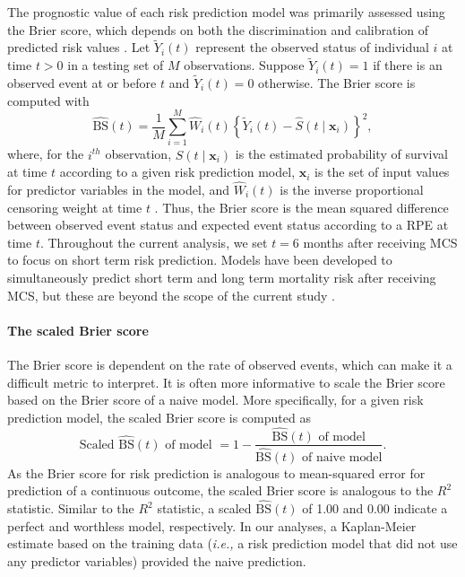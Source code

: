 \documentclass{article}
\begin{document}
The prognostic value of each risk prediction model was primarily
assessed using the Brier score, which depends on both the discrimination
and calibration of predicted risk values
\cite{graf1999assessment, rufibach2010use}. Let \(\tilde{Y}_i(t)\)
represent the observed status of individual \(i\) at time \(t > 0\) in a
testing set of \(M\) observations. Suppose \(\tilde{Y}_i(t)=1\) if there
is an observed event at or before \(t\) and \(\tilde{Y}_i(t)=0\)
otherwise. The Brier score is computed with
\begin{equation} \label{eqn:brier_score}
\widehat{\textrm{BS}}(t)= \frac{1}{M} \sum_{i=1}^{M} \widehat{W}_i(t) \left\{ \tilde{Y}_i(t) - \widehat{S}(t \mid \bm{x}_i) \right\}^2, \end{equation}
where, for the \(i^{th}\) observation, \(\widehat{S}(t \mid \bm{x}_i)\)
is the estimated probability of survival at time \(t\) according to a
given risk prediction model, \(\bm{x}_i\) is the set of input values for
predictor variables in the model, and \(\widehat{W}_i(t)\) is the
inverse proportional censoring weight at time \(t\)
\cite{gerds2006consistent}. Thus, the Brier score is the mean squared
difference between observed event status and expected event status
according to a RPE at time \(t\). Throughout the current analysis, we
set \(t = 6\) months after receiving MCS to focus on short term risk
prediction. Models have been developed to simultaneously predict short
term and long term mortality risk after receiving MCS, but these are
beyond the scope of the current study
\cite{blackstone1986decomposition}.

\paragraph{The scaled Brier score}

The Brier score is dependent on the rate of observed events, which can
make it a difficult metric to interpret. It is often more informative to
scale the Brier score based on the Brier score of a naive model. More
specifically, for a given risk prediction model, the scaled Brier score
is computed as
\[\textrm{Scaled } \widehat{\textrm{BS}}(t)\textrm{ of model } = 1 - \frac{\widehat{\textrm{BS}}(t)\textrm{ of model}}{\widehat{\textrm{BS}}(t)\textrm{ of naive model}}.\]
As the Brier score for risk prediction is analogous to mean-squared
error for prediction of a continuous outcome, the scaled Brier score is
analogous to the \(R^2\) statistic. Similar to the \(R^2\) statistic, a
scaled \(\widehat{\textrm{BS}}(t)\) of 1.00 and 0.00 indicate a perfect
and worthless model, respectively. In our analyses, a Kaplan-Meier
estimate based on the training data (\textit{i.e., }a risk prediction
model that did not use any predictor variables) provided the naive
prediction.
\end{document}
